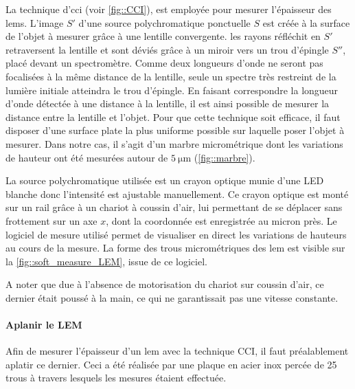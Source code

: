                     La technique d'\gls{cci} (voir \autoref{fig::CCI}), est employée pour mesurer l'épaisseur des \glspl{lem}. L'image $S'$ d'une source polychromatique ponctuelle $S$ est créée à la surface de l'objet à mesurer grâce à une lentille convergente. les rayons réfléchit en $S'$ retraversent la lentille et sont déviés grâce à un miroir vers un trou d'épingle $S''$, placé devant un spectromètre. Comme deux longueurs d'onde ne seront pas focalisées à la même distance de la lentille, seule un spectre très restreint de la lumière initiale atteindra le trou d'épingle. En faisant correspondre la longueur d'onde détectée à une distance à la lentille, il est ainsi possible de mesurer la distance entre la lentille et l'objet.%
                    Pour que cette technique soit efficace, il faut disposer d'une surface plate la plus uniforme possible sur laquelle poser l'objet à mesurer. Dans notre cas, il s'agit d'un marbre micrométrique dont les variations de hauteur ont été mesurées autour de $\SI{5}{\micro\meter}$ (\autoref{fig::marbre}).
                    
                    La source polychromatique utilisée est un crayon optique munie d'une LED blanche donc l'intensité est ajustable manuellement. Ce crayon optique est monté sur un rail grâce à un chariot à coussin d'air, lui permettant de se déplacer sans frottement sur un axe $x$, dont la coordonnée est enregistrée au micron près.
                    Le logiciel de mesure utilisé permet de visualiser en direct les variations de hauteurs au cours de la mesure. La forme des trous micrométriques des \gls{lem} est visible sur la \autoref{fig::soft_measure_LEM}, issue de ce logiciel. 
                    
                    A noter que due à l'absence de motorisation du chariot sur coussin d'air, ce dernier était poussé à la main, ce qui ne garantissait pas une vitesse constante.
                    
                \paragraph{Aplanir le LEM}
                    
                    Afin de mesurer l'épaisseur d'un \gls{lem} avec la technique CCI, il faut préalablement aplatir ce dernier. Ceci a été réalisée par une plaque en acier inox percée de 25 trous à travers lesquels les mesures étaient effectuée. 
                    
